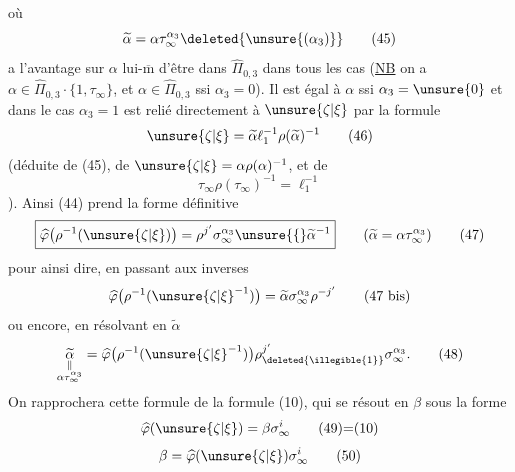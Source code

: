 où 
\[
\widetilde\alpha=\alpha\tau_\infty^{\alpha_3}\deleted{\unsure{(\alpha_3)}}
\tag{45}
\]
a l'avantage sur $\alpha$ lui-$\overline{\mathrm m}$ d'être dans $\widehat\Pi_{0,3}$ dans tous les cas (\uline{NB} on a
$\alpha\in\widehat\Pi_{0,3}\cdot\{1,\tau_\infty\}$, et $\alpha\in\widehat\Pi_{0,3}$ ssi $\alpha_3=0$).
Il est égal à $\alpha$ ssi $\alpha_3=\unsure{0}$ et dans le cas $\alpha_3=1$  est relié directement à $\unsure{\zeta|\xi}$ par la formule
\[
\unsure{\zeta|\xi}=\widetilde\alpha\ell_1^{-1}\rho(\widetilde\alpha)^{-1}
\tag{46}
\]
(déduite de (45), de $\unsure{\zeta|\xi}=\alpha\rho(\alpha)^{-1}$, et de
\[
\tau_\infty\rho(\tau_\infty)^{-1}=\ell_1^{-1}
\tag{**}
\]
).
Ainsi (44) prend la forme définitive
\[
\boxed{\widehat{\varphi}\bigl(\rho^{-1}(\unsure{\zeta|\xi})\bigr)=\rho^{j'}\sigma_\infty^{\alpha_3}\unsure{\lbrace}\widetilde\alpha^{-1}}
\qquad(\widetilde\alpha=\alpha\tau_\infty^{\alpha_3})
\tag{47}
\]
pour ainsi dire, en passant aux inverses
\[
\widehat{\varphi}\bigl(\rho^{-1}(\unsure{\zeta|\xi}^{-1})\bigr)=\widetilde\alpha\sigma_\infty^{\alpha_3}\rho^{-j'}
\tag{47 bis}
\]
ou encore, en résolvant en $\widetilde\alpha$
\[
\underset{\substack{\Vert\\\alpha\tau_\infty^{\alpha_3}}}{\widetilde\alpha}
=\widehat{\varphi}\bigl(\rho^{-1}(\unsure{\zeta|\xi}^{-1})\bigr)\rho_{\deleted{\illegible{1}}}^{j'}\sigma_\infty^{\alpha_3}.
\tag{48}
\]
On rapprochera cette formule de la formule (10), qui se résout en $\beta$ sous la forme
\[
\widehat{\varphi}(\unsure{\zeta|\xi})=\beta\sigma_\infty^i
\tag*{(49)=(10)}
\]
\[
\beta=\widehat{\varphi}(\unsure{\zeta|\xi})\sigma_\infty^i
\tag{50}
\]


